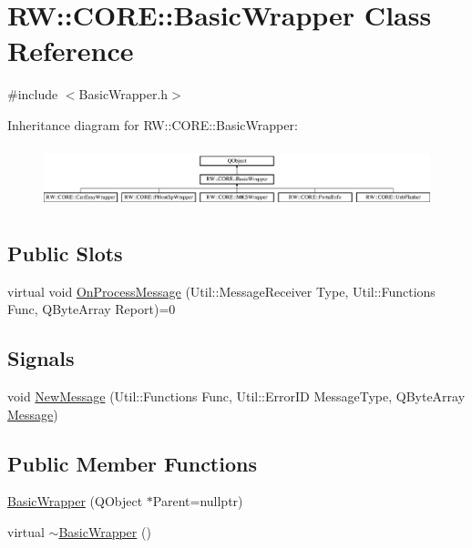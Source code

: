 \hypertarget{class_r_w_1_1_c_o_r_e_1_1_basic_wrapper}{}\section{RW\+:\+:C\+O\+RE\+:\+:Basic\+Wrapper Class Reference}
\label{class_r_w_1_1_c_o_r_e_1_1_basic_wrapper}


{\ttfamily \#include $<$Basic\+Wrapper.\+h$>$}

Inheritance diagram for RW\+:\+:C\+O\+RE\+:\+:Basic\+Wrapper\+:\begin{figure}[H]
\begin{center}
\leavevmode
\includegraphics[height=1.806452cm]{class_r_w_1_1_c_o_r_e_1_1_basic_wrapper}
\end{center}
\end{figure}
\subsection*{Public Slots}
\begin{DoxyCompactItemize}
\item 
virtual void \hyperlink{class_r_w_1_1_c_o_r_e_1_1_basic_wrapper_a8541942f3b9c66acbc86c2d4310c622b}{On\+Process\+Message} (Util\+::\+Message\+Receiver Type, Util\+::\+Functions Func, Q\+Byte\+Array Report)=0
\end{DoxyCompactItemize}
\subsection*{Signals}
\begin{DoxyCompactItemize}
\item 
void \hyperlink{class_r_w_1_1_c_o_r_e_1_1_basic_wrapper_a9c59f7978bd65b16bff623f414fab06f}{New\+Message} (Util\+::\+Functions Func, Util\+::\+Error\+ID Message\+Type, Q\+Byte\+Array \hyperlink{namespace_r_w_1_1_c_o_r_e_a571834b44d0e3fab58aa6abfe5a02988}{Message})
\end{DoxyCompactItemize}
\subsection*{Public Member Functions}
\begin{DoxyCompactItemize}
\item 
\hyperlink{class_r_w_1_1_c_o_r_e_1_1_basic_wrapper_a637f4211c459a11dfc5e2564e3e706f8}{Basic\+Wrapper} (Q\+Object $\ast$Parent=nullptr)
\item 
virtual \hyperlink{class_r_w_1_1_c_o_r_e_1_1_basic_wrapper_aae30fea5f2a60ebd199be2c9fe2e691f}{$\sim$\+Basic\+Wrapper} ()
\end{DoxyCompactItemize}


